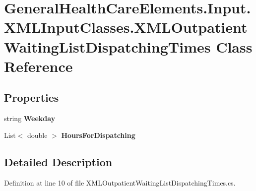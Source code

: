 \hypertarget{class_general_health_care_elements_1_1_input_1_1_x_m_l_input_classes_1_1_x_m_l_outpatient_waiting_list_dispatching_times}{}\section{General\+Health\+Care\+Elements.\+Input.\+X\+M\+L\+Input\+Classes.\+X\+M\+L\+Outpatient\+Waiting\+List\+Dispatching\+Times Class Reference}
\label{class_general_health_care_elements_1_1_input_1_1_x_m_l_input_classes_1_1_x_m_l_outpatient_waiting_list_dispatching_times}
\subsection*{Properties}
\begin{DoxyCompactItemize}
\item 
string {\bfseries Weekday}\hypertarget{class_general_health_care_elements_1_1_input_1_1_x_m_l_input_classes_1_1_x_m_l_outpatient_waiting_list_dispatching_times_a9effca56bafd2c1b7867666656441bd5}{}\label{class_general_health_care_elements_1_1_input_1_1_x_m_l_input_classes_1_1_x_m_l_outpatient_waiting_list_dispatching_times_a9effca56bafd2c1b7867666656441bd5}

\item 
List$<$ double $>$ {\bfseries Hours\+For\+Dispatching}\hypertarget{class_general_health_care_elements_1_1_input_1_1_x_m_l_input_classes_1_1_x_m_l_outpatient_waiting_list_dispatching_times_a0fa9e41518a15f8404800bc427cd97c8}{}\label{class_general_health_care_elements_1_1_input_1_1_x_m_l_input_classes_1_1_x_m_l_outpatient_waiting_list_dispatching_times_a0fa9e41518a15f8404800bc427cd97c8}

\end{DoxyCompactItemize}


\subsection{Detailed Description}


Definition at line 10 of file X\+M\+L\+Outpatient\+Waiting\+List\+Dispatching\+Times.\+cs.

